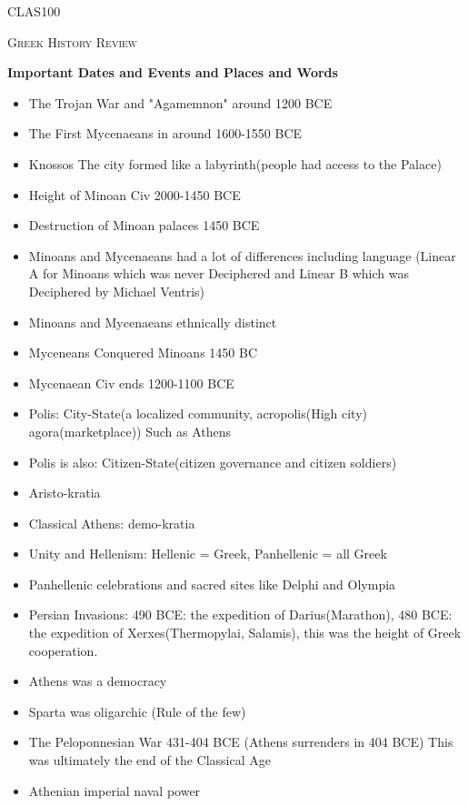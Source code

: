 \documentclass[12pt,a4paper]{report}
\begin{document}
	\centering
	{\scshape\LARGE CLAS100 \par}
	{\scshape\Large Greek History Review \par}
	\vspace{1.5cm}

\textbf{Important Dates and Events and Places and Words}
\begin{itemize}
\item The Trojan War and "Agamemnon" around 1200 BCE
\item The First Mycenaeans in around 1600-1550 BCE
\item Knossos The city formed like a labyrinth(people had access to the Palace)
\item Height of Minoan Civ 2000-1450 BCE
\item Destruction of Minoan palaces 1450 BCE
\item Minoans and Mycenaeans had a lot of differences including language (Linear A for Minoans which was never Deciphered and Linear B which was Deciphered by Michael Ventris)
\item Minoans and Mycenaeans ethnically distinct
\item Myceneans Conquered Minoans 1450 BC
\item Mycenaean Civ ends 1200-1100 BCE 
\item Polis: City-State(a localized community, acropolis(High city) agora(marketplace)) Such as Athens
\item Polis is also: Citizen-State(citizen governance and citizen soldiers)
\item Aristo-kratia
\item Classical Athens: demo-kratia
\item Unity and Hellenism: Hellenic = Greek, Panhellenic = all Greek
\item Panhellenic celebrations and sacred sites like Delphi and Olympia
\item Persian Invasions: 490 BCE: the expedition of Darius(Marathon), 480 BCE: the expedition of Xerxes(Thermopylai, Salamis), this was the height of Greek cooperation.
\item Athens was a democracy
\item Sparta was oligarchic (Rule of the few)
\item The Peloponnesian War 431-404 BCE (Athens surrenders in 404 BCE) This was ultimately the end of the Classical Age
\item Athenian imperial naval power 

\end{itemize}
\end{document}
